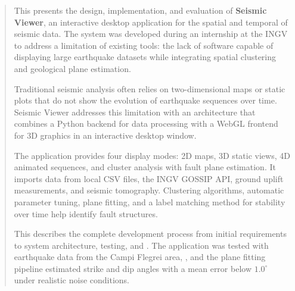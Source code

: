 \begin{abstract}
This  presents the design, implementation, and evaluation of \textbf{Seismic Viewer}, an interactive desktop application for the spatial and temporal  of seismic data. The system was developed during an internship at the INGV to address a limitation of existing tools: the lack of software capable of displaying large earthquake datasets while integrating spatial clustering and geological plane estimation.

Traditional seismic analysis often relies on two-dimensional maps or static plots that do not show the evolution of earthquake sequences over time. Seismic Viewer addresses this limitation with an architecture that combines a Python backend for data processing with a WebGL frontend for 3D graphics in an interactive desktop window.

The application provides four display modes: 2D maps, 3D static views, 4D animated sequences, and cluster analysis with fault plane estimation. It imports data from local CSV files, the INGV GOSSIP API, ground uplift measurements, and seismic tomography. Clustering algorithms, automatic parameter tuning, plane fitting, and a label matching method for  stability over time help identify fault structures.

This  describes the complete development process from initial requirements to system architecture, testing, and . The application was tested with earthquake data from the Campi Flegrei area, , and the plane fitting pipeline estimated strike and dip angles with a mean error below $1.0^\circ$ under realistic noise conditions.
\end{abstract}
